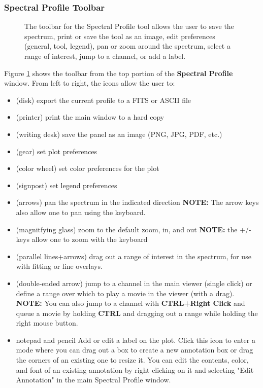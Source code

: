 \subsubsection{Spectral Profile Toolbar}
\label{section:display.image.specprof.toolbar}

\begin{figure}[h!]
\begin{center}
\caption{\label{fig:viewer_spectoolbar} The toolbar for the Spectral Profile tool allows the user to
save the spectrum, print or save the tool as an image, edit preferences (general, tool, legend),
pan or zoom around the spectrum, select a range of interest, jump to a channel, or add a label.}
\hrulefill
\end{center}
\end{figure}

Figure \ref{fig:viewer_spectoolbar} shows the toolbar from the top portion of the {\bf Spectral Profile} 
window. From left to right, the icons allow the user to:

\begin{itemize}
\item (disk) export the current profile to a FITS or ASCII file
\item (printer) print the main window to a hard copy
\item (writing desk) save the panel as an image (PNG, JPG, PDF, etc.)
\item (gear) set plot preferences
\item (color wheel) set color preferences for the plot
\item (signpost) set legend preferences
\item (arrows) pan the spectrum in the indicated direction
{\bf NOTE:} The arrow keys also allow one to pan using the keyboard.
\item (magnitfying glass) zoom to the default zoom, in, and out
{\bf NOTE:} the +/- keys allow one to zoom with the keyboard
\item (parallel lines+arrows) drag out a range of interest in the spectrum, for use with fitting or line overlays.
\item (double-ended arrow) jump to a channel in the main viewer (single click) or define a range over which to play
a movie in the viewer (with a drag). {\bf NOTE:} You can also jump to a channel with {\bf CTRL+Right Click} and
queue a movie by holding {\bf CTRL} and dragging out a range while holding the right mouse button.
\item {notepad and pencil} Add or edit a label on the plot. Click this icon to enter a mode where you can
drag out a box to create a new annotation box or drag the corners of an existing one to resize it. You can edit 
the contents, color, and font of an existing annotation by right clicking on it and selecting "Edit Annotation"
in the main Spectral Profile window.
\end{itemize}

